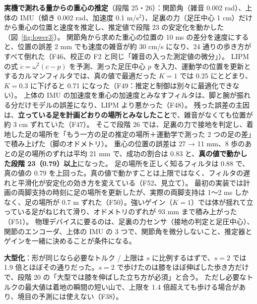 \documentclass[paper=a4paper,fontsize=10pt,twocolumn,column_gap=2zw,line_length=24zw,number_of_lines=46,head_space=20mm]{jlreq}
\begin{document}
\textbf{実機で測れる量からの重心の推定}（段階 25・26）：関節角（雑音 0.002 rad）、上体の IMU（傾き 0.002 rad、加速度 0.1 m/s$^2$）、足裏の力（足圧中心 1 cm）だけから重心の位置と速度を推定し、推定値で段階 23 の安定化を動かした（図~\ref{fig:lower3}）。
関節角から求めた重心の位置の 10 ms の差分を速度にすると、位置の誤差 2 mm でも速度の雑音が約 30 cm/s になり、24 通りの歩き方がすべて倒れた（F46、校正の F2 と同じ「雑音の入った測定値の微分」）。
LIPM の式 $\ddot c=\omega^2(c-p)$ を予測、測った足圧中心 $p$ を入力、運動学の位置を更新とするカルマンフィルタでは、真の値で最適だった $K=1$ では 0.25 にとどまり、$K=0.3$ に下げると 0.71 になった（F49：推定と制御は別々に最適化できない）。
上体の IMU の加速度を重心の加速度とみなすフィルタは、脚と腕が振れる分だけモデルの誤差になり、LIPM より悪かった（F48）。
残った誤差の主因は、\textbf{立っている足を計画どおりの場所とみなしたこと}で、雑音がなくても位置が約 3 cm ずれていた（F47）。
そこで段階 26 では、足裏の力で接地を判定し、着地した足の場所を「もう一方の足の推定の場所＋運動学で測った 2 つの足の差」で積み上げた（脚のオドメトリ）。
重心の位置の誤差は 27 → 11 mm、8 歩のあとの足の場所のずれは平均 21 mm で、成功の割合は 0.83 と、\textbf{真の値で動かした段階 23（0.79）以上}になった。
足の場所を正しく知るフィルタは 0.88 で、真の値の 0.79 を上回った。真の値で動かすことは上限ではなく、フィルタの遅れと平滑化が安定化の効き方を変えている（F52、見立て）。
最初の実装では計画の両脚支持の時刻に足の場所を更新したが、実際の両脚支持は 1〜2 ms しかなく、足の場所が 0.7 m ずれた（F50）。強いゲイン（$K=1$）では体が揺れて立っている足がねじれて滑り、オドメトリのずれが 93 mm まで積み上がった（F51）。
物理デバイスに要るのは、足裏の力センサ（接地の判定と足圧中心）、関節のエンコーダ、上体の IMU の 3 つで、関節角を微分しないこと、推定器とゲインを一緒に決めることが条件になる。

\textbf{大型化}：形が同じなら必要なトルク / 上限は $s$ に比例するはずで、$s=2$ では 1.9 倍とほぼその通りだった。$s=2$ で歩けたのは膝をほぼ伸ばした歩き方だけで、段階 20 の「大型では膝を伸ばした立ち方が必須」と合う。
ただし必要なトルクの最大値は着地の瞬間の短い山で、上限を 1.4 倍超えても歩ける場合があり、境目の予測には使えない（F38）。
\end{document}
